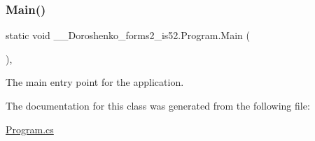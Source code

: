 \subsubsection{\texorpdfstring{Main()}{Main()}}
{\footnotesize\ttfamily static void \+\_\+\_\+\+Doroshenko\+\_\+forms2\+\_\+is52.\+Program.\+Main (\begin{DoxyParamCaption}{ }\end{DoxyParamCaption})\hspace{0.3cm}{\ttfamily [static]}, {\ttfamily [private]}}



The main entry point for the application. 



The documentation for this class was generated from the following file\+:\begin{DoxyCompactItemize}
\item 
\hyperlink{_program_8cs}{Program.\+cs}\end{DoxyCompactItemize}

